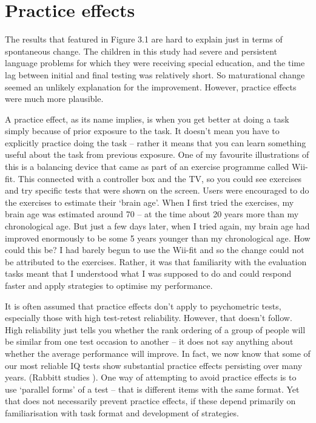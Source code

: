 \documentclass[]{book}
\begin{document}
\hypertarget{practice-effects}{%
\section{Practice effects}\label{practice-effects}}

The results that featured in Figure 3.1 are hard to explain just in terms of spontaneous change. The children in this study had severe and persistent language problems for which they were receiving special education, and the time lag between initial and final testing was relatively short. So maturational change seemed an unlikely explanation for the improvement. However, practice effects were much more plausible.

A practice effect, as its name implies, is when you get better at doing a task simply because of prior exposure to the task. It doesn't mean you have to explicitly practice doing the task -- rather it means that you can learn something useful about the task from previous exposure. One of my favourite illustrations of this is a balancing device that came as part of an exercise programme called Wii-fit. This connected with a controller box and the TV, so you could see exercises and try specific tests that were shown on the screen. Users were encouraged to do the exercises to estimate their `brain age'. When I first tried the exercises, my brain age was estimated around 70 -- at the time about 20 years more than my chronological age. But just a few days later, when I tried again, my brain age had improved enormously to be some 5 years younger than my chronological age. How could this be? I had barely begun to use the Wii-fit and so the change could not be attributed to the exercises. Rather, it was that familiarity with the evaluation tasks meant that I understood what I was supposed to do and could respond faster and apply strategies to optimise my performance.

It is often assumed that practice effects don't apply to psychometric tests, especially those with high test-retest reliability. However, that doesn't follow. High reliability just tells you whether the rank ordering of a group of people will be similar from one test occasion to another -- it does not say anything about whether the average performance will improve. In fact, we now know that some of our most reliable IQ tests show substantial practice effects persisting over many years. (Rabbitt studies ). One way of attempting to avoid practice effects is to use `parallel forms' of a test -- that is different items with the same format. Yet that does not necessarily prevent practice effects, if these depend primarily on familiarisation with task format and development of strategies.
\end{document}
